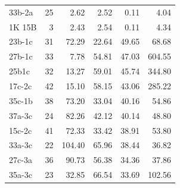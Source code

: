 \begin{tabular}{lrrrrr}
33b-2a & 25 & 2.62 & 2.52 & 0.11 & 4.04 \\
1K 15B & 3 & 2.43 & 2.54 & 0.11 & 4.34 \\
23b-1c & 31 & 72.29 & 22.64 & 49.65 & 68.68 \\
27b-1c & 33 & 7.78 & 54.81 & 47.03 & 604.55 \\
25b1c & 32 & 13.27 & 59.01 & 45.74 & 344.80 \\
17c-2c & 42 & 15.10 & 58.15 & 43.06 & 285.22 \\
35c-1b & 38 & 73.20 & 33.04 & 40.16 & 54.86 \\
37a-3c & 24 & 82.26 & 42.12 & 40.14 & 48.80 \\
15c-2c & 41 & 72.33 & 33.42 & 38.91 & 53.80 \\
33a-3c & 22 & 104.40 & 65.96 & 38.44 & 36.82 \\
27c-3a & 36 & 90.73 & 56.38 & 34.36 & 37.86 \\
35a-3c & 23 & 32.85 & 66.54 & 33.69 & 102.56 \\
\bottomrule
\end{tabular}
